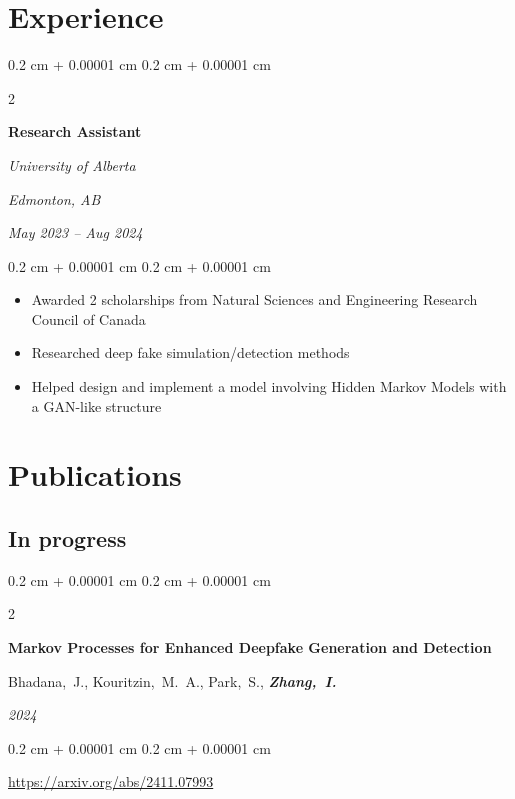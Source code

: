 \documentclass[10pt, letterpaper]{article}
\newenvironment{highlights}{
    \begin{itemize}[
        topsep=0.10 cm,
        parsep=0.10 cm,
        partopsep=0pt,
        itemsep=0pt,
        leftmargin=0.4 cm + 10pt
    ]
}{
    \end{itemize}
} %
\newenvironment{onecolentry}{
    \begin{adjustwidth}{
        0.2 cm + 0.00001 cm
    }{
        0.2 cm + 0.00001 cm
    }
}{
    \end{adjustwidth}
} %
\newenvironment{twocolentry}[2][]{
    \onecolentry
    \def\secondColumn{#2}
    \setcolumnwidth{\fill, 4.5 cm}
    \begin{paracol}{2}
}{
    \switchcolumn \raggedleft \secondColumn
    \end{paracol}
    \endonecolentry
} %
\begin{document}
    
    \section{Experience}

        \begin{twocolentry}{
        \textit{Edmonton, AB}    
            
        \textit{May 2023 – Aug 2024}}
            \textbf{Research Assistant}
            
            \textit{University of Alberta}
        \end{twocolentry}

        \vspace{0.10 cm}
        \begin{onecolentry}
            \begin{highlights}
                \item Awarded 2 scholarships from Natural Sciences and Engineering Research Council of Canada
                \item Researched deep fake simulation/detection methods
                \item Helped design and implement a model involving Hidden Markov Models with a GAN-like structure
            \end{highlights}
        \end{onecolentry}


        \vspace{0.2 cm}


    \section{Publications}
    \subsection{In progress}

        \begin{samepage}
            \begin{twocolentry}{
                \textit{2024}
            }
                \textbf{Markov Processes for Enhanced Deepfake Generation and
                Detection}

                \vspace{0.10 cm}

                \mbox{Bhadana, J.}, \mbox{Kouritzin, M. A.}, \mbox{Park, S.}, \mbox{\textbf{\textit{Zhang, I.}}}
            \end{twocolentry}
            \vspace{0.10 cm}
            \begin{onecolentry}
                \url{https://arxiv.org/abs/2411.07993}
            \end{onecolentry}
        \end{samepage}
\end{document}
